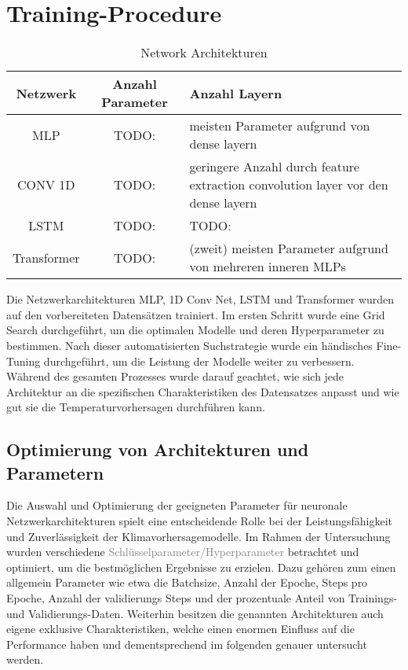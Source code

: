 \documentclass[manuscript,screen,review]{acmart}
\begin{document}
\todo


\section{Training-Procedure}
\begin{table}
  \caption{Network Architekturen}
  \label{tab:freq}
  \begin{tabular}{ccl}
    \toprule
    Netzwerk&Anzahl Parameter&Anzahl Layern\\
    \midrule
    MLP & TODO: & meisten Parameter aufgrund von dense layern\\
    CONV 1D & TODO: & geringere Anzahl durch feature extraction convolution layer vor den dense layern\\
    LSTM & TODO: & TODO:\\
    Transformer & TODO: & (zweit) meisten Parameter aufgrund von mehreren inneren MLPs\\
  \bottomrule
\end{tabular}
\end{table}

Die Netzwerkarchitekturen MLP, 1D Conv Net, LSTM und Transformer wurden auf den vorbereiteten Datensätzen trainiert. 
Im ersten Schritt wurde eine Grid Search durchgeführt, um die optimalen Modelle und deren Hyperparameter zu bestimmen. 
Nach dieser automatisierten Suchstrategie wurde ein händisches Fine-Tuning durchgeführt, um die Leistung der Modelle weiter zu verbessern. 
Während des gesamten Prozesses wurde darauf geachtet, wie sich jede Architektur an die spezifischen Charakteristiken des Datensatzes anpasst und 
wie gut sie die Temperaturvorhersagen durchführen kann.

\subsection{Optimierung von Architekturen und Parametern}
Die Auswahl und Optimierung der geeigneten Parameter für neuronale Netzwerkarchitekturen spielt eine entscheidende Rolle bei der Leistungsfähigkeit und Zuverlässigkeit der Klimavorhersagemodelle. 
Im Rahmen der Untersuchung wurden verschiedene \textcolor{gray}{Schlüsselparameter/Hyperparameter} betrachtet und optimiert, um die bestmöglichen Ergebnisse zu erzielen.
Dazu gehören zum einen allgemein Parameter wie etwa die Batchsize, Anzahl der Epoche, Steps pro Epoche, Anzahl der validierungs Steps und der prozentuale Anteil von Trainings- und Validierungs-Daten.
Weiterhin besitzen die genannten Architekturen auch eigene exklusive Charakteristiken, welche einen enormen Einfluss auf die Performance haben und dementsprechend im folgenden genauer untersucht werden.
\end{document}
